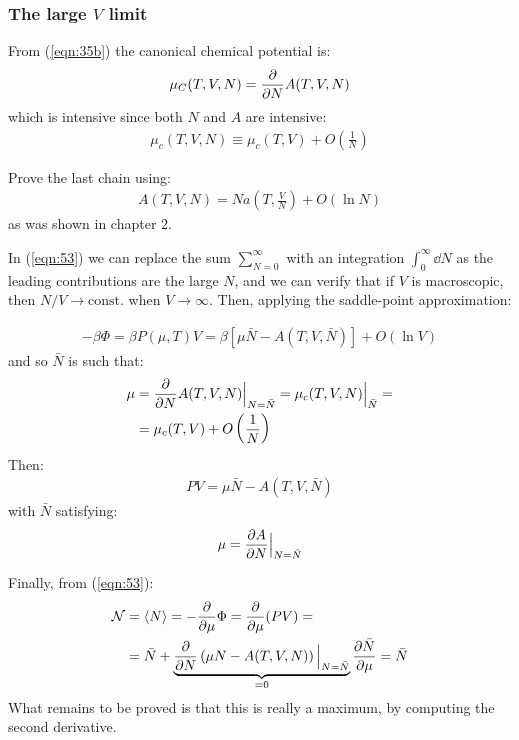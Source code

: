 \documentclass[../../main.tex]{subfiles}
\begin{document}
\subsubsection{The large $V$ limit}
From (\ref{eqn:35b}) the canonical chemical potential is:
\begin{align*}
    \mu_C(T, V, N) = \pdv{N} A(T,V,N)
\end{align*}
which is intensive since both $N$ and $A$ are intensive:
\begin{align*}
    \mu_c(T,V,N) \equiv \mu_c (T, V) + O\left(\frac{1}{N} \right)
\end{align*}

\begin{exo}[2]
    Prove the last chain using:
    \begin{align*}
        A(T,V,N) = N a\left(T, \frac{V}{N} \right) + O(\ln N)
    \end{align*}
    as was shown in chapter $2$.
\end{exo}

In (\ref{eqn:53}) we can replace the sum $\sum_{N=0}^\infty$ with an integration $\int_0^\infty \dd{N}$ as the leading contributions are the large $N$, and we can verify  that if $V$ is macroscopic, then $N/V \to \text{const.}$ when $V \to \infty$. Then, applying the saddle-point approximation:

\begin{align*}
    -\beta \Phi = \beta P(\mu, T) V = \beta[\mu \bar{N} - A(T, V, \bar{N})] + O(\ln V)
\end{align*}
and so $\bar{N}$ is such that:
\begin{align*}
    \mu &= \pdv{N} A(T,V,N)\Big|_{N = \bar{N}} = \mu_c (T, V, N) \Big|_{\bar{N}} =\\
    &= \mu_c(T,V) + O\left(\frac{1}{N} \right)
\end{align*}
Then:
\begin{align*}
    PV = \mu \bar{N} - A(T, V, \bar{N})
\end{align*}
with $\bar{N}$ satisfying:
\begin{align*}
    \mu = \pdv{A}{N}(T,V,N)\Big|_{N = \bar{N}}
\end{align*}

Finally, from (\ref{eqn:53}):
\begin{align*}
    \mathcal{N} &= \langle N \rangle = -\pdv{\mu} \Phi = \pdv{\mu} (PV) =\\
    &= \bar{N} + \underbrace{\pdv{N} \left(\mu N - A(T, V, N)\right)\Big|_{N = \bar{N}}}_{=0}  \pdv{\bar{N}}{\mu} = \bar{N}
\end{align*}
What remains to be proved is that this is really a maximum, by computing the second derivative. 
\end{document}
